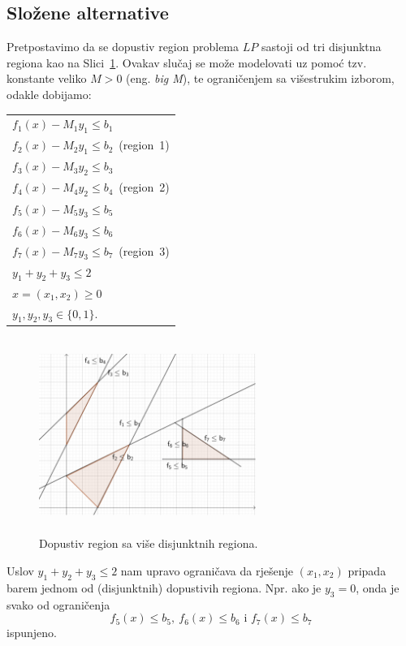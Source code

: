\documentclass[a4paper, utf8, 11pt, colorlinks]{book}
\theoremstyle{definition}
\begin{document}
\subsection{Složene alternative}
 Pretpostavimo da se dopustiv region problema $LP$ sastoji od tri disjunktna regiona kao na Slici~\ref{fig:compound_regions}. Ovakav slučaj se može modelovati uz pomoć tzv. konstante veliko $M>0$ (eng. \emph{big M}), te  ograničenjem sa višestrukim izborom, odakle dobijamo:
 \begin{center}
	\begin{tabular}{l }
        $f_1(x) - M_1 y_1 \leq b_1$ \\
       $f_2(x) - M_2 y_1 \leq b_2$\ (\mbox{region 1}) \\ \hline
        $f_3(x) - M_3 y_2 \leq b_3$ \\ 
        $f_4(x) - M_4 y_2 \leq b_4$\ (\mbox{region 2})\\  \hline 
       $f_5(x) - M_5 y_3 \leq b_5$ \\
        $f_6(x) - M_6 y_3 \leq b_6 $\\
        $f_7(x) - M_7 y_3 \leq b_7$\  (\mbox{region 3}) \\ \hline
        $y_1 + y_2 + y_3 \leq 2$ \\
       $x=(x_1, x_2) \geq 0$ \\
        $y_1, y_2, y_3 \in \{0, 1\}$.
	\end{tabular}
\end{center}
\begin{figure}[!ht]
    \centering
    \includegraphics[width=200pt, height=180pt]{compound.eps}
    \caption{Dopustiv region sa više disjunktnih regiona.}
    \label{fig:compound_regions}
\end{figure}
Uslov $y_1 + y_2 + y_3 \leq 2$ nam upravo ograničava da rješenje $(x_1, x_2)$ pripada barem jednom od (disjunktnih) dopustivih regiona. Npr. ako je $y_3 = 0$, onda je svako od ograničenja $$f_5(x) \leq b_5, \ f_6(x) \leq b_6 \mbox{ i } f_7(x) \leq b_7$$
 ispunjeno. 
\end{document}
